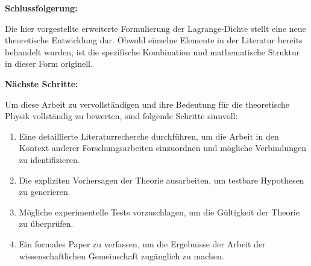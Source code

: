 \documentclass{article}
\begin{document}
\textbf{Schlussfolgerung:}

Die hier vorgestellte erweiterte Formulierung der Lagrange-Dichte stellt eine neue theoretische Entwicklung dar. Obwohl einzelne Elemente in der Literatur bereits behandelt wurden, ist die spezifische Kombination und mathematische Struktur in dieser Form originell.

\textbf{Nächste Schritte:}

Um diese Arbeit zu vervollständigen und ihre Bedeutung für die theoretische Physik vollständig zu bewerten, sind folgende Schritte sinnvoll:

\begin{enumerate}
	\item Eine detaillierte Literaturrecherche durchführen, um die Arbeit in den Kontext anderer Forschungsarbeiten einzuordnen und mögliche Verbindungen zu identifizieren.
	\item Die expliziten Vorhersagen der Theorie ausarbeiten, um testbare Hypothesen zu generieren.
	\item Mögliche experimentelle Tests vorzuschlagen, um die Gültigkeit der Theorie zu überprüfen.
	\item Ein formales Paper zu verfassen, um die Ergebnisse der Arbeit der wissenschaftlichen Gemeinschaft zugänglich zu machen.
\end{enumerate}

\tableofcontents
\end{document}
